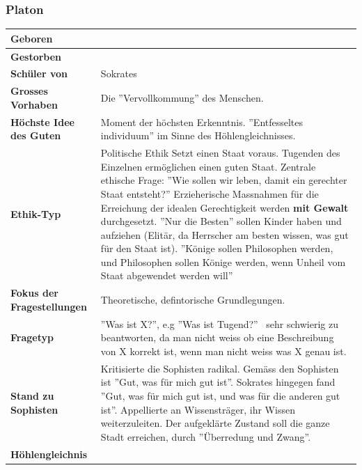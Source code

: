 		\subsubsection{Platon}
			\begin{longtable}{>{\bfseries}p{}p{}}
				\hline
				Geboren
					& \\
				\hline
				Gestorben
					& \\
				\hline
				Schüler von
					& Sokrates\\
				\hline
				Grosses Vorhaben
					& Die ''Vervollkommung'' des Menschen.\\
				\hline
				Höchste Idee des Guten
					& Moment der höchsten Erkenntnis. ''Entfesseltes individuum'' im Sinne des Höhlengleichnisses.\\
				\hline
				Ethik-Typ
					& Politische Ethik\newline
						Setzt einen Staat voraus.\newline
						Tugenden des Einzelnen ermöglichen einen guten Staat.\newline
						Zentrale ethische Frage: ''Wie sollen wir leben, damit ein gerechter Staat entsteht?''\newline
						Erzieherische Massnahmen für die Erreichung der idealen Gerechtigkeit werden \textbf{mit Gewalt} durchgesetzt.\newline
						''Nur die Besten'' sollen Kinder haben und aufziehen (Elitär, da Herrscher am besten wissen, was gut für den Staat ist).\newline
						''Könige sollen Philosophen werden, und Philosophen sollen Könige werden, wenn Unheil vom Staat abgewendet werden will''\\
				\hline
				Fokus der Fragestellungen
					& Theoretische, defintorische Grundlegungen.\\
				\hline
				Fragetyp
					& ''Was ist X?'', e.g ''Was ist Tugend?''\newline
						\textrightarrow\ sehr schwierig zu beantworten, da man nicht weiss ob eine Beschreibung von X korrekt ist, wenn man nicht weiss was X genau ist.\\
				\hline
				Stand zu Sophisten
					& Kritisierte die Sophisten radikal.\newline
					  Gemäss den Sophisten ist ''Gut, was für mich gut ist''.\newline
					  Sokrates hingegen fand ''Gut, was für mich gut ist, und was für die anderen gut ist''.\newline
					  Appellierte an Wissensträger, ihr Wissen weiterzuleiten.\newline
					  Der aufgeklärte Zustand soll die ganze Stadt erreichen, durch ''Überredung und Zwang''.\\
				\hline
				Höhlengleichnis
					&	\vspace{0pt}
						

\end{longtable}
